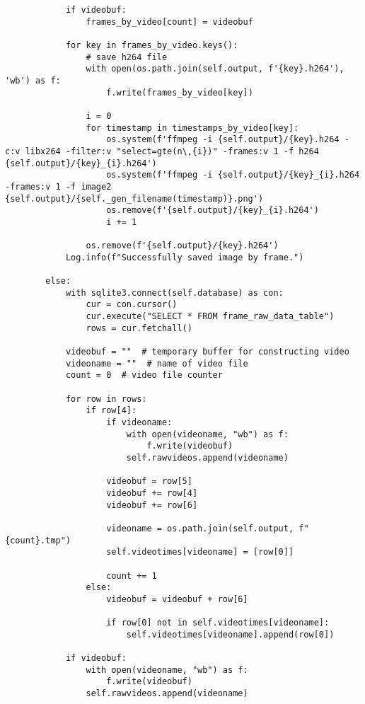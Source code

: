 \documentclass{easychair}
\begin{document}
\begin{enumerate}
\begin{lstlisting}
            if videobuf:
                frames_by_video[count] = videobuf

            for key in frames_by_video.keys():
                # save h264 file
                with open(os.path.join(self.output, f'{key}.h264'), 'wb') as f:
                    f.write(frames_by_video[key])

                i = 0
                for timestamp in timestamps_by_video[key]:
                    os.system(f'ffmpeg -i {self.output}/{key}.h264 -c:v libx264 -filter:v "select=gte(n\,{i})" -frames:v 1 -f h264 {self.output}/{key}_{i}.h264')
                    os.system(f'ffmpeg -i {self.output}/{key}_{i}.h264 -frames:v 1 -f image2 {self.output}/{self._gen_filename(timestamp)}.png')
                    os.remove(f'{self.output}/{key}_{i}.h264')
                    i += 1

                os.remove(f'{self.output}/{key}.h264')
            Log.info(f"Successfully saved image by frame.")

        else:
            with sqlite3.connect(self.database) as con:
                cur = con.cursor()
                cur.execute("SELECT * FROM frame_raw_data_table")
                rows = cur.fetchall()

            videobuf = ""  # temporary buffer for constructing video
            videoname = ""  # name of video file
            count = 0  # video file counter

            for row in rows:
                if row[4]:
                    if videoname:
                        with open(videoname, "wb") as f:
                            f.write(videobuf)
                        self.rawvideos.append(videoname)

                    videobuf = row[5]
                    videobuf += row[4]
                    videobuf += row[6]

                    videoname = os.path.join(self.output, f"{count}.tmp")
                    self.videotimes[videoname] = [row[0]]

                    count += 1
                else:
                    videobuf = videobuf + row[6]

                    if row[0] not in self.videotimes[videoname]:
                        self.videotimes[videoname].append(row[0])

            if videobuf:
                with open(videoname, "wb") as f:
                    f.write(videobuf)
                self.rawvideos.append(videoname)


\end{lstlisting}
\end{enumerate}
\end{document}
